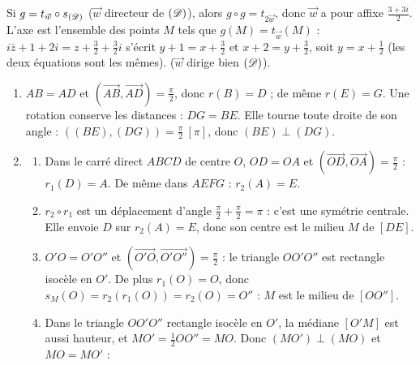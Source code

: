\begin{corrige}
\begin{sol}
\begin{enumerate}
\begin{enumerate}
                        Si $g = t_{\vec{w}} \circ s_{(\mathscr{D})}$ ($\vec{w}$ directeur de $(\mathscr{D})$), alors $g \circ g = t_{2\vec{w}}$, donc $\vec{w}$ a pour affixe $\frac{3+3i}{2}$.
                        L'axe est l'ensemble des points $M$ tels que $g(M) = t_{\vec{w}}(M)$ :
                        $i\bar{z} + 1 + 2i = z + \frac32 + \frac32 i$ s'écrit $y + 1 = x + \frac32$ et $x + 2 = y + \frac32$, soit $y = x + \frac12$ (les deux équations sont les mêmes).
                         ($\vec{w}$ dirige bien $(\mathscr{D})$).
            \end{enumerate}
\end{enumerate}
\end{sol}
\begin{sol}
\begin{enumerate}
      \item $AB = AD$ et $(\overrightarrow{AB},\overrightarrow{AD}) = \frac{\pi}{2}$, donc $r(B) = D$ ; de même $r(E) = G$.
            Une rotation conserve les distances : $DG = BE$. Elle tourne toute droite de son angle : $((BE),(DG)) = \frac{\pi}{2}\ [\pi]$,
            donc $(BE) \perp (DG)$.
      \item \begin{enumerate}
                  \item Dans le carré direct $ABCD$ de centre $O$, $OD = OA$ et $(\overrightarrow{OD},\overrightarrow{OA}) = \frac{\pi}{2}$ : $r_1(D) = A$.
                        De même dans $AEFG$ : $r_2(A) = E$.
                  \item $r_2 \circ r_1$ est un déplacement d'angle $\frac{\pi}{2} + \frac{\pi}{2} = \pi$ : c'est une symétrie centrale.
                        Elle envoie $D$ sur $r_2(A) = E$, donc son centre est le milieu $M$ de $[DE]$.
                  \item $O'O = O'O''$ et $(\overrightarrow{O'O},\overrightarrow{O'O''}) = \frac{\pi}{2}$ : le triangle $OO'O''$ est rectangle isocèle en $O'$.
                        De plus $r_1(O) = O$, donc $s_M(O) = r_2(r_1(O)) = r_2(O) = O''$ : $M$ est le milieu de $[OO'']$.
                  \item Dans le triangle $OO'O''$ rectangle isocèle en $O'$, la médiane $[O'M]$ est aussi hauteur, et $MO' = \frac12 OO'' = MO$.
                        Donc $(MO') \perp (MO)$ et $MO = MO'$ : 

\end{enumerate}
\end{enumerate}
\end{sol}
\end{corrige}
